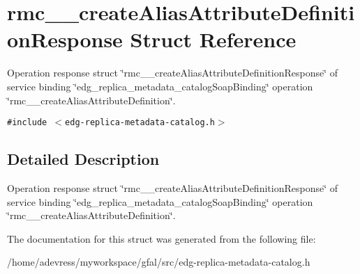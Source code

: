 \section{rmc\_\-\_\-create\-Alias\-Attribute\-Definition\-Response Struct Reference}
\label{structrmc____createAliasAttributeDefinitionResponse}
Operation response struct \char`\"{}rmc\_\-\_\-create\-Alias\-Attribute\-Definition\-Response\char`\"{} of service binding \char`\"{}edg\_\-replica\_\-metadata\_\-catalog\-Soap\-Binding\char`\"{} operation \char`\"{}rmc\_\-\_\-create\-Alias\-Attribute\-Definition\char`\"{}.  


{\tt \#include $<$edg-replica-metadata-catalog.h$>$}



\subsection{Detailed Description}
Operation response struct \char`\"{}rmc\_\-\_\-create\-Alias\-Attribute\-Definition\-Response\char`\"{} of service binding \char`\"{}edg\_\-replica\_\-metadata\_\-catalog\-Soap\-Binding\char`\"{} operation \char`\"{}rmc\_\-\_\-create\-Alias\-Attribute\-Definition\char`\"{}. 



The documentation for this struct was generated from the following file:\begin{CompactItemize}
\item 
/home/adevress/myworkspace/gfal/src/edg-replica-metadata-catalog.h\end{CompactItemize}
